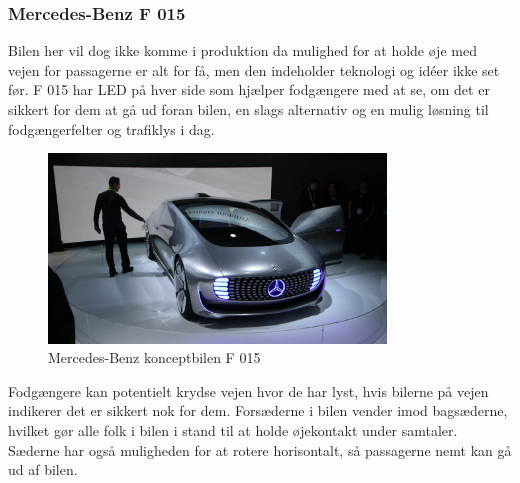 \subsubsection{Mercedes-Benz F 015}
Bilen her vil dog ikke komme i produktion da mulighed for at holde øje med vejen for passagerne er alt for få, men den indeholder teknologi og idéer ikke set før. F 015 har LED på hver side som hjælper fodgængere med at se, om det er sikkert for dem at gå ud foran bilen, en slags alternativ og en mulig løsning til fodgængerfelter og trafiklys i dag.
\begin{figure}[h!]
	\centering
	\includegraphics[width=0.8\textwidth]{images/150106_0422_ces.jpg}
	\caption{Mercedes-Benz konceptbilen F 015}
	\label{fig:Mercedes-Benz_F_015}
\end{figure}
Fodgængere kan potentielt krydse vejen hvor de har lyst, hvis bilerne på vejen indikerer det er sikkert nok for dem. Forsæderne i bilen vender imod bagsæderne, hvilket gør alle folk i bilen i stand til at holde øjekontakt under samtaler. Sæderne har også muligheden for at rotere horisontalt, så passagerne nemt kan gå ud af bilen.
